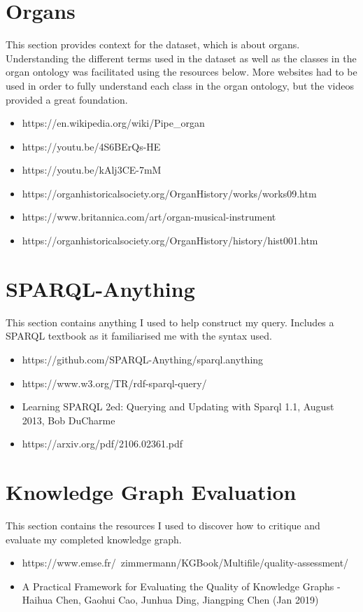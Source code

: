 \section{Organs}
\hspace{0.5cm} This section provides context for the dataset, which is about organs. Understanding the different terms used in the dataset as well as the classes in the organ ontology was facilitated using the resources below. More websites had to be used in order to fully understand each class in the organ ontology, but the videos provided a great foundation. 

\begin{itemize}
\item https://en.wikipedia.org/wiki/Pipe\_organ 
\item https://youtu.be/4S6BErQs-HE 
\item https://youtu.be/kAlj3CE-7mM 
\item https://organhistoricalsociety.org/OrganHistory/works/works09.htm
\item https://www.britannica.com/art/organ-musical-instrument
\item https://organhistoricalsociety.org/OrganHistory/history/hist001.htm
\end{itemize}

\section{SPARQL-Anything}
\hspace{0.5cm} This section contains anything I used to help construct my query. Includes a SPARQL textbook as it familiarised me with the syntax used. 

\begin{itemize}
\item https://github.com/SPARQL-Anything/sparql.anything 
\item https://www.w3.org/TR/rdf-sparql-query/
\item Learning SPARQL 2ed: Querying and Updating with Sparql 1.1, August 2013, Bob DuCharme
\item https://arxiv.org/pdf/2106.02361.pdf
\end{itemize}

\section{Knowledge Graph Evaluation}
\hspace{0.5cm} This section contains the resources I used to discover how to critique and evaluate my completed knowledge graph. 
\begin{itemize}
\item https://www.emse.fr/~zimmermann/KGBook/Multifile/quality-assessment/
\item A Practical Framework for Evaluating the Quality of Knowledge Graphs - Haihua Chen, Gaohui Cao, Junhua Ding, Jiangping Chen (Jan 2019)
\end{itemize}
